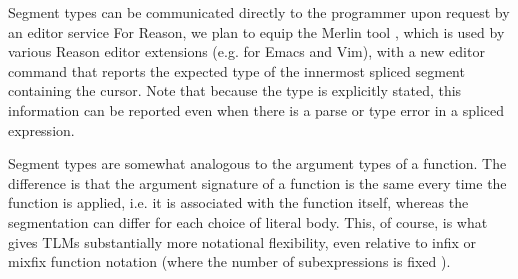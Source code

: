 \documentclass[acmsmall]{acmart}
\begin{document}
Segment types can be communicated directly to the programmer upon request by an editor service For Reason, we plan to equip the {Merlin} tool \cite{Merlin}, which is used by various Reason editor extensions (e.g. for Emacs and Vim), with a new editor command that reports the expected type of the innermost spliced segment containing the cursor. Note that because the type is explicitly stated, this information can be reported even when there is a parse or type error in a spliced expression. %

Segment types are somewhat analogous to the argument types of a function. The difference is that the argument signature of a function is the same every time the function is applied, i.e. it is associated with the function itself, whereas the segmentation can differ for each choice of literal body. This, of course, is what gives TLMs substantially more notational flexibility, even relative to infix or mixfix function notation (where the number of subexpressions is fixed \cite{wieland2009parsing}).%
\end{document}
